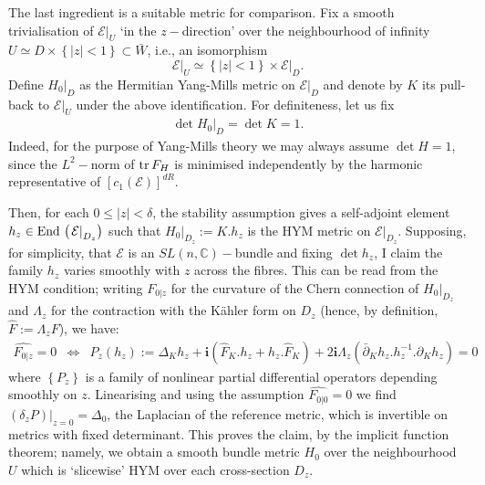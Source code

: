 \documentclass{article}
\newcommand{\func}[1]{\textnormal {#1\,}}
\begin{document}
The last ingredient is a suitable metric for comparison. Fix a smooth trivialisation of $\mathcal{E} \vert_{U}$ `in the $z-$direction' over the neighbourhood of infinity $U\simeq D\times \left\{ \left\vert z\right\vert <1 \right\}\subset \bar{W}$, i.e., an isomorphism 
$$
\left. \mathcal{E}\right\vert _{U}\simeq\left\{ \left\vert z\right\vert <1 \right\}\times \left. \mathcal{E}\right\vert _{D}.
$$ 
Define $\left. H_{0}\right\vert _{D}$ as the Hermitian Yang-Mills metric on $\left. \mathcal{E}\right\vert _{D}$ and denote by $K$ its pull-back to $\left.\mathcal{E}\right\vert _{U}$ under the above identification. For definiteness, let us fix 
\begin{eqnarray}        \label{eq fixed det over D}
        \det \left. H_{0}\right\vert _{D}=\det K=1.
        \end{eqnarray}
Indeed, for the purpose of Yang-Mills theory we may always assume $\det H=1$, since the $%
L^{2}-$norm of $\func{tr}F_{H}$ is minimised independently by the
harmonic representative of $\left[ c_{1}\left( \mathcal{E}\right) \right]
^{dR}$.

Then, for each $0\leq \left\vert z\right\vert <\delta $, the stability assumption gives a self-adjoint element $h_z \in \func{End} \left( \left.\mathcal{E}\right\vert_{D_{z}} \right)$ such that $\left. H_{0}\right\vert _{D_{z}} := {K}.h_z$ is the HYM metric on $\left. \mathcal{E}\right\vert _{D_{z}}$. Supposing, for simplicity, that $\mathcal{E}$ is an $SL(n,\mathbb{C})-$bundle and fixing $\det h_z$, I  claim the family $h_z$ varies smoothly with $z$ across the fibres. This can be read from the HYM condition; writing  $F_{0\vert z}$ for the curvature of the Chern connection of $\left. H_{0}\right\vert _{D_{z}}$ and $\Lambda_z$ for the contraction with the K\"{a}hler form on $D_z$ (hence, by definition, $\hat{F} := \Lambda_z F$), we have:
\begin{eqnarray*}
        \widehat{F_{0\vert z}}=0 &\Leftrightarrow& P_z \left( h_z \right):=         \Delta_K h_{z}+\mathbf{i}\left( \hat{F}_K.h_z + h_z.\hat{F}_K \right)         + 2\mathbf{i}\Lambda_z\left(\bar{\partial}_K h_z.h_z^{-1}.\partial_Kh_z         \right) = 0
\end{eqnarray*}
where $\left\{P_z\right\}$ is a family of nonlinear partial differential operators depending smoothly on $z$. Linearising \cite[p.14]{ASDYM} and using the assumption $\widehat{F_{0\vert 0}}=0$ we find $\left.{\left(\delta_{z}P \right)} \right\vert_{z=0}=\Delta_0$, the Laplacian of the reference metric, which is invertible on metrics with fixed determinant. This proves the claim, by the implicit function theorem; namely, we obtain a smooth bundle metric $H_0$ over the neighbourhood $U$ which is `slicewise' HYM over each cross-section $D_z$.
\end{document}
